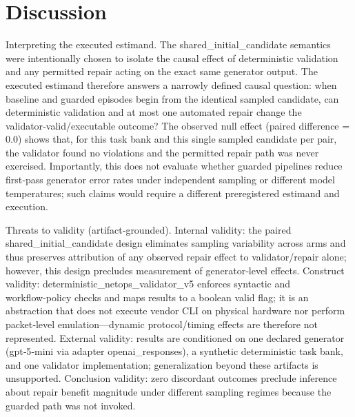\documentclass[conference]{IEEEtran}
\begin{document}
\section{Discussion}
Interpreting the executed estimand. The shared\_initial\_candidate semantics were intentionally chosen to isolate the causal effect of deterministic validation and any permitted repair acting on the exact same generator output. The executed estimand therefore answers a narrowly defined causal question: when baseline and guarded episodes begin from the identical sampled candidate, can deterministic validation and at most one automated repair change the validator‑valid/executable outcome? The observed null effect (paired difference = 0.0) shows that, for this task bank and this single sampled candidate per pair, the validator found no violations and the permitted repair path was never exercised. Importantly, this does not evaluate whether guarded pipelines reduce first‑pass generator error rates under independent sampling or different model temperatures; such claims would require a different preregistered estimand and execution.

Threats to validity (artifact‑grounded). Internal validity: the paired shared\_initial\_candidate design eliminates sampling variability across arms and thus preserves attribution of any observed repair effect to validator/repair alone; however, this design precludes measurement of generator‑level effects. Construct validity: deterministic\_netops\_validator\_v5 enforces syntactic and workflow‑policy checks and maps results to a boolean valid flag; it is an abstraction that does not execute vendor CLI on physical hardware nor perform packet‑level emulation---dynamic protocol/timing effects are therefore not represented. External validity: results are conditioned on one declared generator (gpt‑5‑mini via adapter openai\_responses), a synthetic deterministic task bank, and one validator implementation; generalization beyond these artifacts is unsupported. Conclusion validity: zero discordant outcomes preclude inference about repair benefit magnitude under different sampling regimes because the guarded path was not invoked.
\end{document}
